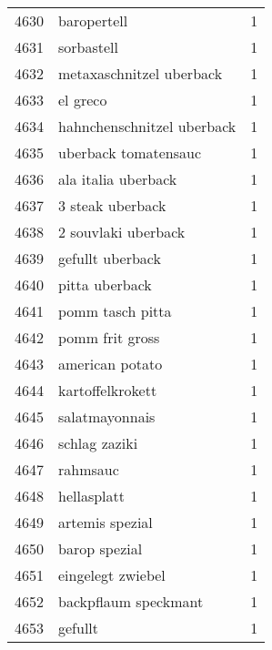 \begin{tabular}{llr}
4630 &                                        baropertell &      1 \\
4631 &                                         sorbastell &      1 \\
4632 &                           metaxaschnitzel uberback &      1 \\
4633 &                                           el greco &      1 \\
4634 &                         hahnchenschnitzel uberback &      1 \\
4635 &                               uberback tomatensauc &      1 \\
4636 &                                ala italia uberback &      1 \\
4637 &                                   3 steak uberback &      1 \\
4638 &                                2 souvlaki uberback &      1 \\
4639 &                                   gefullt uberback &      1 \\
4640 &                                     pitta uberback &      1 \\
4641 &                                   pomm tasch pitta &      1 \\
4642 &                                    pomm frit gross &      1 \\
4643 &                                    american potato &      1 \\
4644 &                                   kartoffelkrokett &      1 \\
4645 &                                     salatmayonnais &      1 \\
4646 &                                      schlag zaziki &      1 \\
4647 &                                           rahmsauc &      1 \\
4648 &                                        hellasplatt &      1 \\
4649 &                                    artemis spezial &      1 \\
4650 &                                      barop spezial &      1 \\
4651 &                                  eingelegt zwiebel &      1 \\
4652 &                               backpflaum speckmant &      1 \\
4653 &                                            gefullt &      1 \\

\end{tabular}
